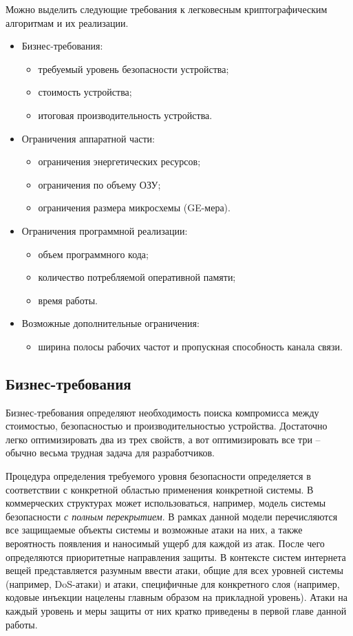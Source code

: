 Можно выделить следующие требования к легковесным криптографическим алгоритмам и их реализации.
\begin{itemize}
	\item Бизнес-требования:
		\begin{itemize}
			\item требуемый уровень безопасности устройства;
			\item стоимость устройства;
			\item итоговая производительность устройства.
		\end{itemize}
	\item Ограничения аппаратной части:
		\begin{itemize}
			\item ограничения энергетических ресурсов;
			\item ограничения по объему ОЗУ;
			\item ограничения размера микросхемы (GE-мера).
		\end{itemize}
	\item Ограничения программной реализации:
		\begin{itemize}
			\item объем программного кода;
			\item количество потребляемой оперативной памяти;
			\item время работы.
		\end{itemize}
	\item Возможные дополнительные ограничения:
		\begin{itemize}
			\item ширина полосы рабочих частот и пропускная способность канала связи.
		\end{itemize}
\end{itemize}

\subsection{Бизнес-требования} %

Бизнес-требования определяют необходимость поиска компромисса между стоимостью, безопасностью и производительностью устройства. Достаточно легко оптимизировать два из трех свойств, а вот оптимизировать все три – обычно весьма трудная задача для разработчиков.

Процедура определения требуемого уровня безопасности определяется в соответствии с конкретной областью применения конкретной системы. В коммерческих структурах может использоваться, например, модель системы безопасности \textit{с полным перекрытием}.  В рамках данной модели перечисляются все защищаемые объекты системы и возможные атаки на них, а также вероятность появления и наносимый ущерб для каждой из атак. После чего определяются приоритетные направления защиты. В контексте систем интернета вещей представляется разумным ввести атаки, общие для всех уровней системы (например, DoS-атаки) и атаки, специфичные для конкретного слоя (например, кодовые инъекции нацелены главным образом на прикладной уровень). Атаки на каждый уровень и меры защиты от них кратко приведены в первой главе данной работы.

